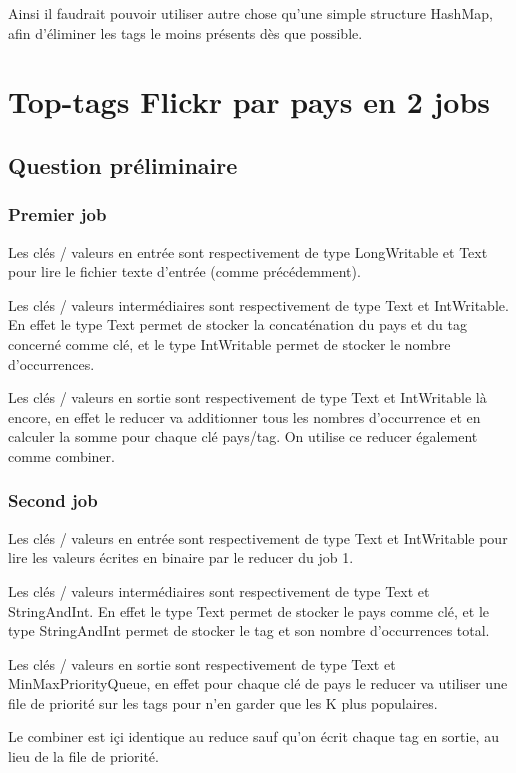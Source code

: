 \documentclass[a4paper, 11pt, titlepage]{article}
\begin{document}
Ainsi il faudrait pouvoir utiliser autre chose qu'une simple structure HashMap, afin d'éliminer les tags le moins présents dès que possible.


\section {Top-tags Flickr par pays en 2 jobs}

\subsection* {Question préliminaire}

\subsubsection* {Premier job}

Les clés / valeurs en entrée sont respectivement de type LongWritable et Text pour lire le fichier texte d'entrée (comme précédemment).

Les clés / valeurs intermédiaires sont respectivement de type Text et IntWritable. En effet le type Text permet de stocker la concaténation du pays et du tag concerné comme clé, et le type IntWritable permet de stocker le nombre d'occurrences.

Les clés / valeurs en sortie sont respectivement de type Text et IntWritable là encore, en effet le reducer va additionner tous les nombres d'occurrence et en calculer la somme pour chaque clé pays/tag. On utilise ce reducer également comme combiner.


\subsubsection* {Second job}

Les clés / valeurs en entrée sont respectivement de type Text et IntWritable pour lire les valeurs écrites en binaire par le reducer du job 1.

Les clés / valeurs intermédiaires sont respectivement de type Text et StringAndInt. En effet le type Text permet de stocker le pays comme clé, et le type StringAndInt permet de stocker le tag et son nombre d'occurrences total.

Les clés / valeurs en sortie sont respectivement de type Text et MinMaxPriorityQueue, en effet pour chaque clé de pays le reducer va utiliser une file de priorité sur les tags pour n'en garder que les K plus populaires.

Le combiner est içi identique au reduce sauf qu'on écrit chaque tag en sortie, au lieu de la file de priorité.
\end{document}
